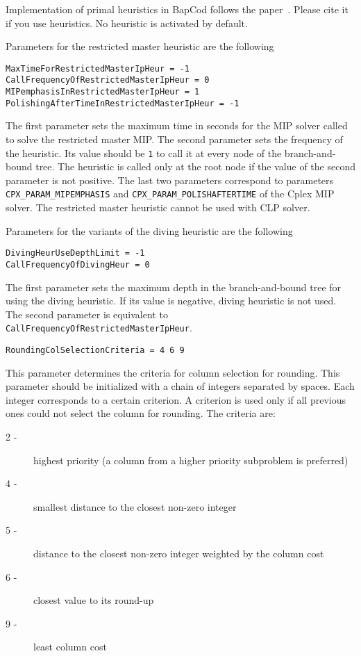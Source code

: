 \documentclass[10pt,a4paper]{article}
\begin{document}
Implementation of primal heuristics in BapCod follows the paper~\cite{SadykovVanderbecPessoa:19a}. Please cite it if you
use heuristics. No heuristic is activated by default.

Parameters for the restricted master heuristic are the following
\begin{lstlisting}
MaxTimeForRestrictedMasterIpHeur = -1
CallFrequencyOfRestrictedMasterIpHeur = 0
MIPemphasisInRestrictedMasterIpHeur = 1
PolishingAfterTimeInRestrictedMasterIpHeur = -1
\end{lstlisting}
The first parameter sets the maximum time in seconds for the MIP solver called to solve the restricted master MIP. The
second parameter sets the frequency of the heuristic. Its value should be \verb+1+ to call it at every node of the
branch-and-bound tree. The heuristic is called only at the root node if the value of the second parameter is not
positive. The last two parameters correspond to parameters \verb+CPX_PARAM_MIPEMPHASIS+ and
\verb+CPX_PARAM_POLISHAFTERTIME+ of the Cplex MIP solver. The restricted master heuristic cannot be used with CLP solver.

Parameters for the variants of the diving heuristic are the following
\begin{lstlisting}
DivingHeurUseDepthLimit = -1 
CallFrequencyOfDivingHeur = 0
\end{lstlisting}
The first parameter sets the maximum depth in the branch-and-bound tree for using the diving heuristic. If its value is
negative, diving heuristic is not used. The second parameter is equivalent to \verb+CallFrequencyOfRestrictedMasterIpHeur+.

\begin{lstlisting}
RoundingColSelectionCriteria = 4 6 9
\end{lstlisting}
This parameter determines the criteria for column selection for rounding. This parameter should be initialized with a
chain of integers separated by spaces. Each integer corresponds to a certain criterion. A criterion is used only if
all previous ones could not select the column for rounding. The criteria are:
\begin{description}
\item[ 2 -] highest priority (a column from a higher priority subproblem is preferred)
\item[ 4 -] smallest distance to the closest non-zero integer
\item[ 5 -] distance to the closest non-zero integer weighted by the column cost
\item[ 6 -] closest value to its round-up
\item[ 9 -] least column cost
\end{description}
\end{document}
